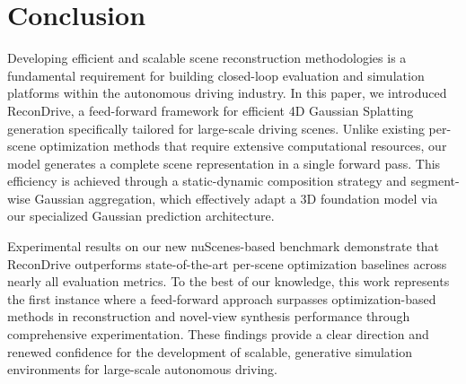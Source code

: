 \section{Conclusion}
\label{sec:conclu}
Developing efficient and scalable scene reconstruction methodologies is a fundamental requirement for building closed-loop evaluation and simulation platforms within the autonomous driving industry. In this paper, we introduced ReconDrive, a feed-forward framework for efficient 4D Gaussian Splatting generation specifically tailored for large-scale driving scenes. Unlike existing per-scene optimization methods that require extensive computational resources, our model generates a complete scene representation in a single forward pass. This efficiency is achieved through a static-dynamic composition strategy and segment-wise Gaussian aggregation, which effectively adapt a 3D foundation model via our specialized Gaussian prediction architecture.

Experimental results on our new nuScenes-based benchmark demonstrate that ReconDrive outperforms state-of-the-art per-scene optimization baselines across nearly all evaluation metrics. To the best of our knowledge, this work represents the first instance where a feed-forward approach surpasses optimization-based methods in reconstruction and novel-view synthesis performance through comprehensive experimentation. These findings provide a clear direction and renewed confidence for the development of scalable, generative simulation environments for large-scale autonomous driving.

